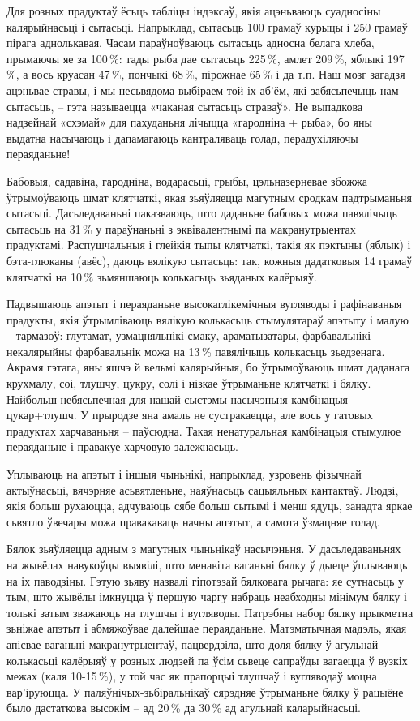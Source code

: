 Для розных прадуктаў ёсьць табліцы індэксаў, якія ацэньваюць суадносіны калярыйнасьці і сытасьці. Напрыклад, сытасьць 100 грамаў курыцы і 250 грамаў пірага аднолькавая. Часам параўноўваюць сытасьць адносна белага хлеба, прымаючы яе за 100\,\%: тады рыба дае сытасьць 225\,\%, амлет 209\,\%, яблыкі 197\,\%, а вось круасан 47\,\%, пончыкі 68\,\%, пірожнае 65\,\% і да т.п. Наш мозг загадзя ацэньвае стравы, і мы несьвядома выбіраем той іх аб'ём, які забясьпечыць нам сытасьць, – гэта называецца «чаканая сытасьць страваў». Не выпадкова надзейнай «схэмай» для пахуданьня лічыцца «гародніна + рыба», бо яны выдатна насычаюць і дапамагаюць кантраляваць голад, перадухіляючы пераяданьне!

Бабовыя, садавіна, гародніна, водарасьці, грыбы, цэльназерневае збожжа ўтрымоўваюць шмат клятчаткі, якая зьяўляецца магутным сродкам падтрыманьня сытасьці. Дасьледаваньні паказваюць, што даданьне бабовых можа павялічыць сытасьць на 31\,\% у параўнаньні з эквівалентнымі па макранутрыентах прадуктамі. Распушчальныя і глейкія тыпы клятчаткі, такія як пэктыны (яблык) і бэта-глюканы (авёс), даюць вялікую сытасьць: так, кожныя дадатковыя 14 грамаў клятчаткі на 10\,\% зьмяншаюць колькасьць зьяданых калёрыяў.

Падвышаюць апэтыт і пераяданьне высокаглікемічныя вугляводы і рафінаваныя прадукты, якія ўтрымліваюць вялікую колькасьць стымулятараў апэтыту і малую – тармазоў: глутамат, узмацняльнікі смаку, араматызатары, фарбавальнікі – некалярыйны фарбавальнік можа на 13\,\% павялічыць колькасьць зьедзенага. Акрамя гэтага, яны яшчэ й вельмі калярыйныя, бо ўтрымоўваюць шмат даданага крухмалу, соі, тлушчу, цукру, солі і нізкае ўтрыманьне клятчаткі і бялку. Найбольш небясьпечная для нашай сыстэмы насычэньня камбінацыя цукар+тлушч. У прыродзе яна амаль не сустракаецца, але вось у гатовых прадуктах харчаваньня – паўсюдна. Такая ненатуральная камбінацыя стымулюе пераяданьне і правакуе харчовую залежнасьць.

Уплываюць на апэтыт і іншыя чыньнікі, напрыклад, узровень фізычнай актыўнасьці, вячэрняе асьвятленьне, наяўнасьць сацыяльных кантактаў. Людзі, якія больш рухаюцца, адчуваюць сябе больш сытымі і менш ядуць, занадта яркае сьвятло ўвечары можа правакаваць начны апэтыт, а самота ўзмацняе голад.

Бялок зьяўляецца адным з магутных чыньнікаў насычэньня. У дасьледаваньнях на жывёлах навукоўцы выявілі, што менавіта ваганьні бялку ў дыеце ўплываюць на іх паводзіны. Гэтую зьяву назвалі гіпотэзай бялковага рычага: яе сутнасьць у тым, што жывёлы імкнуцца ў першую чаргу набраць неабходны мінімум бялку і толькі затым зважаюць на тлушчы і вугляводы. Патрэбны набор бялку прыкметна зьніжае апэтыт і абмяжоўвае далейшае пераяданьне. Матэматычная мадэль, якая апісвае ваганьні макранутрыентаў, пацвердзіла, што доля бялку ў агульнай колькасьці калёрыяў у розных людзей па ўсім сьвеце сапраўды вагаецца ў вузкіх межах (каля 10-15\,\%), у той час як прапорцыі тлушчаў і вугляводаў моцна вар'іруюцца. У паляўнічых-зьбіральнікаў сярэдняе ўтрыманьне бялку ў рацыёне было дастаткова высокім – ад 20\,\% да 30\,\% ад агульнай каларыйнасьці.

